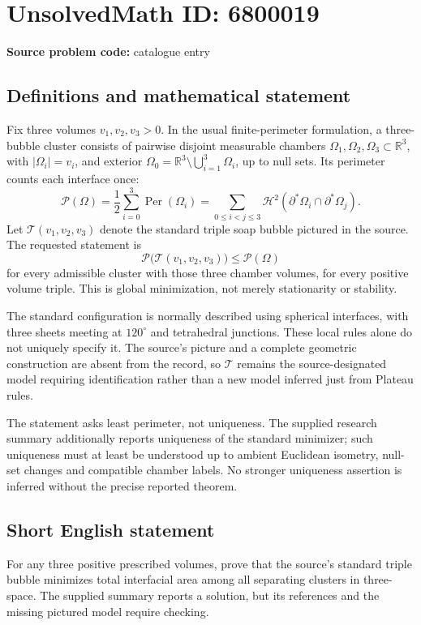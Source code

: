 \documentclass[11pt]{article}
\newcommand{\R}{\mathbb{R}}
\begin{document}
\section*{UnsolvedMath ID: 6800019}
\textbf{Source problem code:} catalogue entry
\subsection{Definitions and mathematical statement}
Fix three volumes $v_1,v_2,v_3>0$. In the usual finite-perimeter formulation, a three-bubble cluster consists of pairwise disjoint measurable chambers $\Omega_1,\Omega_2,\Omega_3\subset\R^3$, with $|\Omega_i|=v_i$, and exterior $\Omega_0=\R^3\setminus\bigcup_{i=1}^3\Omega_i$, up to null sets. Its perimeter counts each interface once:
\[
\mathcal P(\Omega)=\frac12\sum_{i=0}^3\operatorname{Per}(\Omega_i)
=\sum_{0\leq i<j\leq3}\mathcal H^2(\partial^*\Omega_i\cap\partial^*\Omega_j).
\]
Let $\mathcal T(v_1,v_2,v_3)$ denote the standard triple soap bubble pictured in the source. The requested statement is
\[
\mathcal P\bigl(\mathcal T(v_1,v_2,v_3)\bigr)\leq\mathcal P(\Omega)
\]
for every admissible cluster with those three chamber volumes, for every positive volume triple. This is global minimization, not merely stationarity or stability.

The standard configuration is normally described using spherical interfaces, with three sheets meeting at $120^\circ$ and tetrahedral junctions. These local rules alone do not uniquely specify it. The source's picture and a complete geometric construction are absent from the record, so $\mathcal T$ remains the source-designated model requiring identification rather than a new model inferred just from Plateau rules.

The statement asks least perimeter, not uniqueness. The supplied research summary additionally reports uniqueness of the standard minimizer; such uniqueness must at least be understood up to ambient Euclidean isometry, null-set changes and compatible chamber labels. No stronger uniqueness assertion is inferred without the precise reported theorem.
\subsection{Short English statement}
For any three positive prescribed volumes, prove that the source's standard triple bubble minimizes total interfacial area among all separating clusters in three-space. The supplied summary reports a solution, but its references and the missing pictured model require checking.
\end{document}
